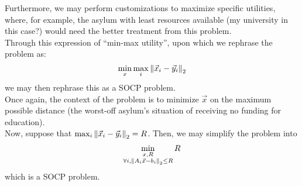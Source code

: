 Furthermore, we may perform customizations to maximize specific utilities, where, for example, the asylum with least resources available (my university in this case?) would need the better treatment from this problem. \\
Through this expression of ``min-max utility'', upon which we rephrase the problem as:
\[
    \min_x \max_i {\| \vec{x}_i - \vec{y}_i \|}_{2}^{}
\]
we may then rephrase this as a SOCP problem. \\
Once again, the context of the problem is to minimize $\vec{x}$ on the maximum possible distance (the worst-off asylum's situation of receiving no funding for education). \\
Now, suppose that $\max_i {\| \vec{x}_i - \vec{y}_i \|}_{2}^{} = R$. Then, we may simplify the problem into
\begin{align*}
    \min_{
        \substack{
            x, R \\
            \forall i, {\| A_i \vec{x} - b_i \|}_{2}^{} \leq R
        }
    } R
\end{align*}
which is a SOCP problem.
